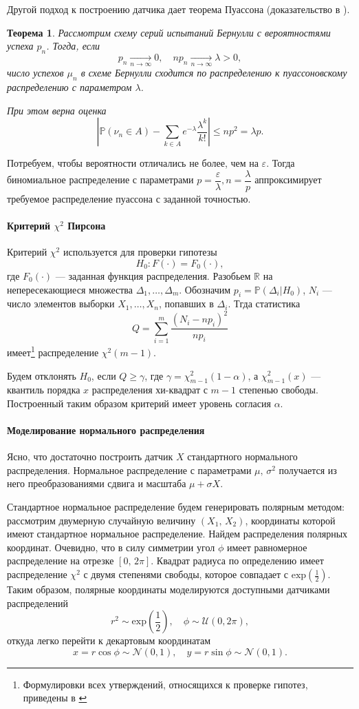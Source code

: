 \documentclass[16pt]{article}
\newtheorem{Th}{Теорема}
\newcommand\Real{\mathbb{R}}
\newcommand\A{(\cdot)}
\newcommand\Sum[2]{\sum\limits_{#1}^{#2}}
\newcommand{\Prb}{\mathbb{P}}
\begin{document}
Другой подход к построению датчика дает теорема Пуассона (доказательство в \cite{Shir}).
\begin{Th}
Рассмотрим схему серий испытаний Бернулли с вероятностями успеха $p_n$. Тогда, если $$p_n \underset{n \to \infty}{\to} 0, \quad 
np_n \underset{n \to \infty}{\to} \lambda > 0,$$
число успехов $\mu_n$ в схеме Бернулли сходится по распределению к пуассоновскому распределению с параметром $\lambda$.

При этом верна оценка
$$\left|\mathbb{P}(\nu_n \in A) - \sum_{k \in A}e^{-\lambda}\dfrac{\lambda^k}{k!}\right| \leq np^2 = \lambda p.$$
\end{Th}

Потребуем, чтобы вероятности отличались не более, чем на $\varepsilon$. Тогда биномиальное распределение с параметрами $p = \dfrac{\varepsilon}{\lambda}, n = \dfrac{\lambda}{p}$ аппроксимирует требуемое распределение пуассона с заданной точностью.

\paragraph{Критерий $\chi^2$ Пирсона} 
Критерий $\chi^2$ используется для проверки гипотезы
$$H_0\colon F\A = F_0\A,$$
где $F_0\A$ --- заданная функция распределения. Разобьем $\Real$ на непересекающиеся множества $\Delta_1, \ldots, \Delta_m$. Обозначим $p_i = \Prb(\Delta_i | H_0)$, $N_i$ --- число элементов выборки $X_1, \ldots, X_n$, попавших в $\Delta_i$. Тгда статистика 
$$Q = \Sum{i=1}{m}\dfrac{(N_i - np_i)^2}{np_i}$$
имеет\footnote{Формулировки всех утверждений, относящихся к проверке гипотез, приведены в \cite{DeGroot}} распределение $\chi^2(m - 1)$.

Будем отклонять $H_0$, если $Q \geq \gamma$, где $\gamma = \chi^2_{m-1}(1 - \alpha)$, а $\chi^2_{m-1}(x)$ --- квантиль порядка $x$ распределения хи-квадрат с $m - 1$ степенью свободы. Построенный таким образом критерий имеет уровень согласия $\alpha$.

\paragraph{Моделирование нормального распределения}
Ясно, что достаточно построить датчик $X$ стандартного нормального распределения. Нормальное распределение с параметрами $\mu,\, \sigma^2$ получается из него преобразованиями сдвига и масштаба $\mu + \sigma X$.

Стандартное нормальное распределение будем генерировать полярным методом: рассмотрим двумерную случайную величину $(X_1,\, X_2)$, координаты которой имеют стандартное нормальное распределение. Найдем распределения полярных  координат. Очевидно, что в силу симметрии угол $\phi$ имеет равномерное распределение на отрезке $[0,\, 2\pi]$. Квадрат радиуса по определению имеет распределение $\chi^2$ с двумя степенями свободы, которое совпадает с $\mathrm{exp}\left(\frac12\right)$. Таким образом, полярные координаты моделируются доступными датчиками распределений
$$r^2 \sim \mathrm{exp}\left(\frac12\right), \quad \phi \sim \mathcal{U}(0, 2\pi),$$
откуда легко перейти к декартовым координатам
$$x = r \cos\phi \sim \mathcal{N}(0, 1), \quad y = r \sin \phi \sim \mathcal{N}(0, 1).$$
\end{document}
